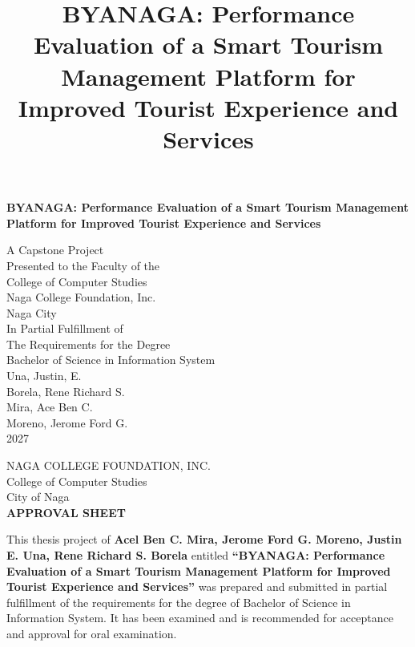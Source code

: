 \documentclass{research}
\title{BYANAGA: Performance Evaluation of a Smart Tourism Management Platform for Improved Tourist Experience and Services}
\begin{document}
\pagestyle{empty}
\thispagestyle{empty}
\begin{singlespacing}
\begin{center}
  \vspace*{0in}
  {\Huge\bfseries BYANAGA: Performance Evaluation of a Smart Tourism Management Platform for Improved Tourist Experience and Services\par}
  \vspace{1in}
  A Capstone Project\\
  Presented to the Faculty of the\\
  College of Computer Studies\\
  Naga College Foundation, Inc.\\
  Naga City\\
  \vspace{1in}
  In Partial Fulfillment of\\
  The Requirements for the Degree\\
  Bachelor of Science in Information System\\
  \vspace{0.5in}
  Una, Justin, E.\\
  Borela, Rene Richard S.\\
  Mira, Ace Ben C.\\
  Moreno, Jerome Ford G.\\
  \vfill
  2027
\end{center}
\end{singlespacing}
\clearpage

\thispagestyle{fancy}
\begin{center}
  \vspace*{0.45in}
  NAGA COLLEGE FOUNDATION, INC.\\
  College of Computer Studies\\
  City of Naga\\[1.5em]

  {\bfseries APPROVAL SHEET}
\end{center}

\vspace{1.25em}

\begin{center}
\begin{minipage}{0.90\textwidth}
\setlength{\parindent}{0.35in}
This thesis project of \textbf{Acel Ben C. Mira, Jerome Ford G. Moreno, Justin E. Una, Rene Richard S. Borela} entitled \textbf{``BYANAGA: Performance Evaluation of a Smart Tourism Management Platform for Improved Tourist Experience and Services''} was prepared and submitted in partial fulfillment of the requirements for the degree of Bachelor of Science in Information System. It has been examined and is recommended for acceptance and approval for oral examination.
\end{minipage}
\end{center}
\end{document}
